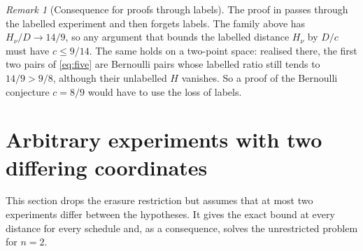 \documentclass[11pt,a4paper]{article}
\theoremstyle{definition}\newtheorem{definition}[theorem]{Definition}
\theoremstyle{remark}\newtheorem{remark}[theorem]{Remark}
\begin{document}
\begin{remark}[Consequence for proofs through labels]\label{rem:labelled}
The proof in \cite{KApr} passes through the labelled experiment and then forgets labels. The family above has $H_\nu/D\to14/9$, so any argument that bounds the labelled distance $H_\nu$ by $D/c$ must have $c\le9/14$. The same holds on a two-point space: realised there, the first two pairs of \eqref{eq:five} are Bernoulli pairs whose labelled ratio still tends to $14/9>9/8$, although their unlabelled $H$ vanishes. So a proof of the Bernoulli conjecture $c=8/9$ \cite{KJan} would have to use the loss of labels.
\end{remark}

\section{Arbitrary experiments with two differing coordinates}\label{sec:two}
This section drops the erasure restriction but assumes that at most two experiments differ between the hypotheses. It gives the exact bound at every distance for every schedule and, as a consequence, solves the unrestricted problem for $n=2$.
\end{document}
